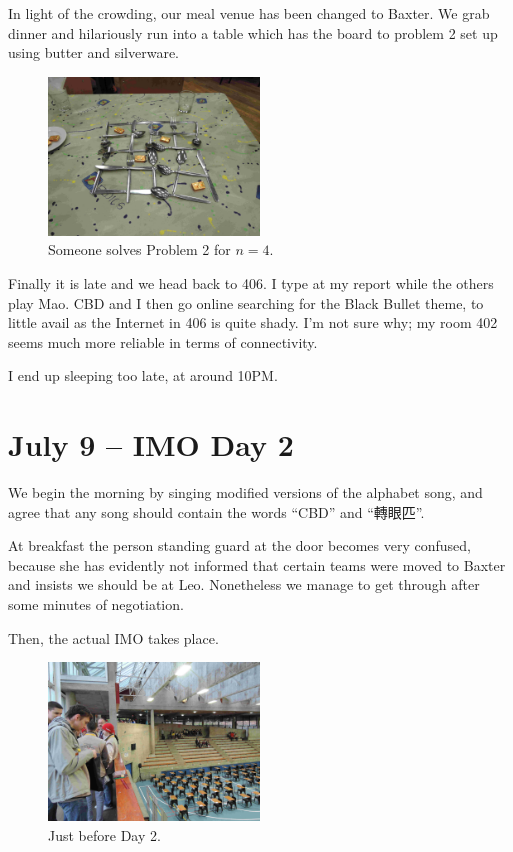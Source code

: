 \documentclass[11pt]{scrreprt}
\numberwithin{figure}{chapter}
\begin{document}
In light of the crowding, our meal venue has been changed to Baxter.
We grab dinner and hilariously run into a table which has the board
to problem 2 set up using butter and silverware.

\begin{figure}[ht]
  \centering
  \includegraphics[width=0.5\textwidth]{media/epicwin.jpg}
  \caption{Someone solves Problem 2 for $n=4$.}
\end{figure}


Finally it is late and we head back to 406. I type at my report while the others play Mao.
CBD and I then go online searching for the Black Bullet theme, to little avail as the Internet in 406 is quite shady.
I'm not sure why; my room 402 seems much more reliable in terms of connectivity.

I end up sleeping too late, at around 10PM.

\section{July 9 -- IMO Day 2}
We begin the morning by singing modified versions of the alphabet song, and agree that any song should contain
the words ``CBD'' and ``轉眼匹''.

At breakfast the person standing guard at the door becomes very confused, because she has evidently not informed
that certain teams were moved to Baxter and insists we should be at Leo. Nonetheless we manage to get through after
some minutes of negotiation.

Then, the actual IMO takes place.

\begin{figure}[ht]
  \centering
  \includegraphics[width=0.5\textwidth]{media/IMO_D2.jpg}
  \caption{Just before Day 2.}
\end{figure}
\end{document}
